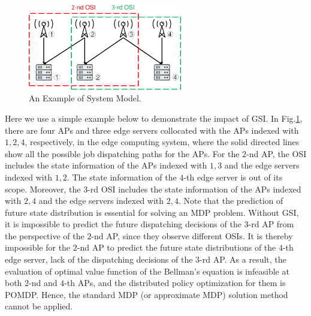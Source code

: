 \documentclass[12pt, onecolumn]{IEEEtran}
\theoremstyle{definition}             %
\theoremstyle{remark}                 %
\theoremstyle{plain}                  %
\begin{document}
{        %
        \begin{figure}[htp!]
            \centering
            \includegraphics[width=0.60\textwidth]{osi-example.pdf}
            \caption{An Example of System Model.}
            \label{fig:osi_example}
        \end{figure}
        Here we use a simple example below to demonstrate the impact of GSI.
        {
            In Fig.\ref{fig:osi_example}, there are four APs and three edge servers collocated with the APs indexed with $1,2,4$, respectively, in the edge computing system, where the solid directed lines show all the possible job dispatching paths for the APs.
            For the $2$-nd AP, the OSI includes the state information of the APs indexed with $1,3$ and the edge servers indexed with $1,2$.
            The state information of the $4$-th edge server is out of its scope.
            Moreover, the $3$-rd OSI includes the state information of the APs indexed with $2,4$ and the edge servers indexed with $2,4$.
        }%
        Note that the prediction of future state distribution is essential for solving an MDP problem.
        {
            Without GSI, it is impossible to predict the future dispatching decisions of the $3$-rd AP from the perspective of the $2$-nd AP, since they observe different OSIs.
            It is thereby impossible for the $2$-nd AP to predict the future state distributions of the $4$-th edge server, lack of the dispatching decisions of the $3$-rd AP.
            As a result, the evaluation of optimal value function of the Bellman's equation is infeasible at both $2$-nd and $4$-th APs, and the distributed policy optimization for them is POMDP.
        }%
        Hence, the standard MDP (or approximate MDP) solution method cannot be applied.

}
\end{document}
